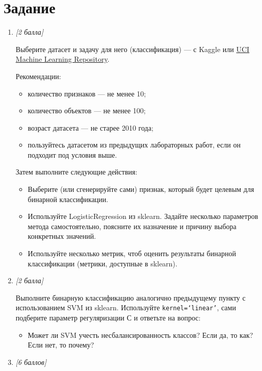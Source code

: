 \section{Задание}

\begin{enumerate}[label=\textbf{Task \arabic*:}, leftmargin=*]

\item \textit{[2 балла]}

Выберите датасет и задачу для него (классификация) --- с Kaggle или \href{https://archive.ics.uci.edu/datasets}{UCI Machine Learning Repository}.

Рекомендации:
\begin{itemize}
    \item количество признаков --- не менее 10;
    \item количество объектов --- не менее 100;
    \item возраст датасета --- не старее 2010 года;
    \item пользуйтесь датасетом из предыдущих лабораторных работ, если он подходит под условия выше.
\end{itemize}

Затем выполните следующие действия:
\begin{itemize}
    \item Выберите (или сгенерируйте сами) признак, который будет целевым для бинарной классификации.
    \item Используйте LogisticRegression из sklearn. Задайте несколько параметров метода самостоятельно, поясните их назначение и причину выбора конкретных значений.
    \item Используйте несколько метрик, чтоб оценить результаты бинарной классификации (метрики, доступные в sklearn).
\end{itemize}

\item \textit{[2 балла]}

Выполните бинарную классификацию аналогично предыдущему пункту с использованием SVM из sklearn. Используйте \texttt{kernel=‘linear’}, сами подберите параметр регуляризации С и ответьте на вопрос:
\begin{itemize}
    \item Может ли SVM учесть несбалансированность классов? Если да, то как? Если нет, то почему?
\end{itemize}

\item \textit{[6 баллов]}


\end{enumerate}
